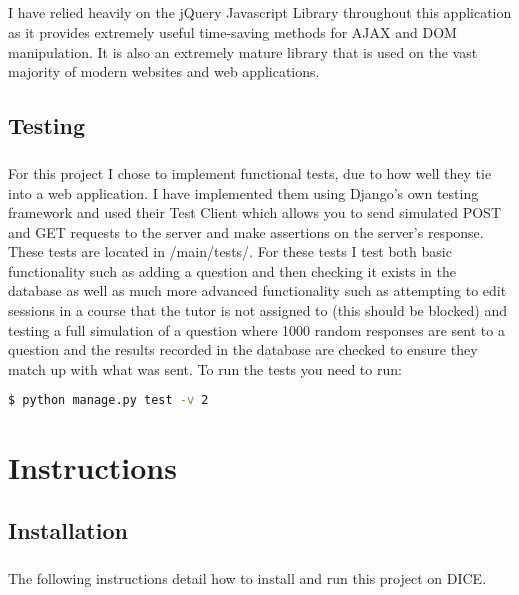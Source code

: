 \documentclass[10pt]{report}
\begin{document}
    \paragraph{}
    I have relied heavily on the jQuery Javascript Library throughout this application as it provides
    extremely useful time-saving methods for AJAX and DOM manipulation.  It is also an extremely mature
    library that is used on the vast majority of modern websites and web applications.
    
    \section*{Testing}
    \paragraph{}
    For this project I chose to implement functional tests, due to how well they tie into a web
    application.  I have implemented them using Django's own testing framework and used their Test Client
    which allows you to send simulated POST and GET requests to the server and make assertions on the
    server's response.  These tests are located in /main/tests/.  For these tests I test both basic
    functionality such as adding a question and then checking it exists in the database as well as much
    more advanced functionality such as attempting to edit sessions in a course that the tutor is not
    assigned to (this should be blocked) and testing a full simulation of a question where 1000 random
    responses are sent to a question and the results recorded in the database are checked to ensure they
    match up with what was sent.  To run the tests you need to run:
    \begin{lstlisting}[language=bash]
    	$ python manage.py test -v 2
    \end{lstlisting}

    
    \chapter*{Instructions}
    \section*{Installation}
    \paragraph{}
    The following instructions detail how to install and run this project on DICE.
    
\end{document}

